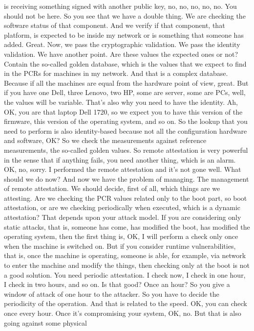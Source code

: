  is receiving something signed with another public key, no, no, no, no, no. You
 should not be here. So you see that we have a double thing. We are checking
 the software status of that component. And we verify if that component, that
 platform, is expected to be inside my network or is something that someone has
 added. Great. Now, we pass the cryptographic validation. We pass the identity
 validation. We have another point. Are these values the expected ones or not?
 Contain the so-called golden database, which is the values that we expect to
 find in the PCRs for machines in my network. And that is a complex database.
 Because if all the machines are equal from the hardware point of view, great.
 But if you have one Dell, three Lenovo, two HP, some are server, some are PCs,
 well, the values will be variable. That's also why you need to have the
 identity. Ah, OK, you are that laptop Dell 1720, so we expect you to have this
 version of the firmware, this version of the operating system, and so on. So
 the lookup that you need to perform is also identity-based because not all the
 configuration hardware and software, OK? So we check the measurements against
 reference measurements, the so-called golden values. So remote attestation is
 very powerful in the sense that if anything fails, you need another thing,
 which is an alarm. OK, no, sorry. I performed the remote attestation and it's
 not gone well. What should we do now? And now we have the problem of managing.
 The management of remote attestation. We should decide, first of all, which
 things are we attesting. Are we checking the PCR values related only to the
 boot part, so boot attestation, or are we checking periodically when executed,
 which is a dynamic attestation? That depends upon your attack model. If you
 are considering only static attacks, that is, someone has come, has modified
 the boot, has modified the operating system, then the first thing is, OK, I
 will perform a check only once when the machine is switched on. But if you
 consider runtime vulnerabilities, that is, once the machine is operating,
 someone is able, for example, via network to enter the machine and modify the
 things, then checking only at the boot is not a good solution. You need
 periodic attestation. I check now, I check in one hour, I check in two hours,
 and so on. Is that good? Once an hour? So you give a window of attack of one
 hour to the attacker. So you have to decide the periodicity of the operation.
 And that is related to the speed. OK, you can check once every hour. Once it's
 compromising your system, OK, no. But that is also going against some physical
